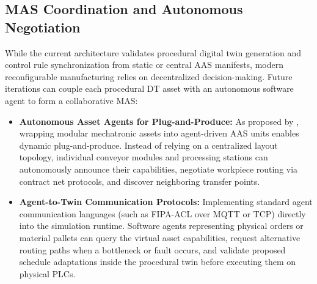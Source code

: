 \subsection{\texorpdfstring{\gls{MAS}}{MAS} Coordination and Autonomous Negotiation}
While the current architecture validates procedural digital twin generation and control rule synchronization from static or central \gls{AAS} manifests, modern reconfigurable manufacturing relies on decentralized decision-making. Future iterations can couple each procedural \gls{DT} asset with an autonomous software agent to form a collaborative \gls{MAS}:
\begin{itemize}
    \item \textbf{Autonomous Asset Agents for Plug-and-Produce:} As proposed by \textcite{Rocha2024}, wrapping modular mechatronic assets into agent-driven \gls{AAS} units enables dynamic plug-and-produce. Instead of relying on a centralized layout topology, individual conveyor modules and processing stations can autonomously announce their capabilities, negotiate workpiece routing via contract net protocols, and discover neighboring transfer points.
    \item \textbf{Agent-to-Twin Communication Protocols:} Implementing standard agent communication languages (such as FIPA-ACL over \gls{MQTT} or \gls{TCP}) directly into the simulation runtime. Software agents representing physical orders or material pallets can query the virtual asset capabilities, request alternative routing paths when a bottleneck or fault occurs, and validate proposed schedule adaptations inside the procedural twin before executing them on physical \glspl{PLC}.
\end{itemize}

